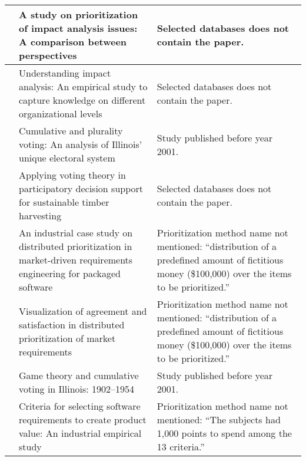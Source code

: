 {\begin{tabular}{
|>{\raggedright}p{}
|>{\raggedright}p{}
|>{\raggedright}p{}
|}
\citet{Jonsson2005} & A study on prioritization of impact analysis issues: A comparison between perspectives &
Selected databases does not contain the paper.
\tabularnewline \hline

\citet{Jonsson2005a} & Understanding impact analysis: An empirical study to capture knowledge on different organizational levels &
Selected databases does not contain the paper.
\tabularnewline \hline

\citet{Kuklinski1973} & Cumulative and plurality voting: An analysis of Illinois' unique electoral system &
Study published before year 2001.
\tabularnewline \hline

\citet{Laukkanen2004} & Applying voting theory in participatory decision support for sustainable timber harvesting &
Selected databases does not contain the paper.
\tabularnewline \hline

\citet{Regnell2001} & An industrial case study on distributed prioritization in market-driven requirements engineering for packaged software &
Prioritization method name not mentioned: ``distribution of a predefined amount of fictitious money (\$100,000) over the items to be prioritized.''
\tabularnewline \hline

\citet{Regnell2000} & Visualization of agreement and satisfaction in distributed prioritization of market requirements &
Prioritization method name not mentioned: ``distribution of a predefined amount of fictitious money (\$100,000) over the items to be prioritized.''
\tabularnewline \hline

\citet{Sawyer1962} & Game theory and cumulative voting in Illinois: 1902--1954 &
Study published before year 2001.
\tabularnewline \hline

\citet{Wohlin2006} & Criteria for selecting software requirements to create product value: An industrial empirical study &
Prioritization method name not mentioned: ``The subjects had 1,000 points to spend among the 13 criteria.''
\tabularnewline \hline

\end{tabular}
}
